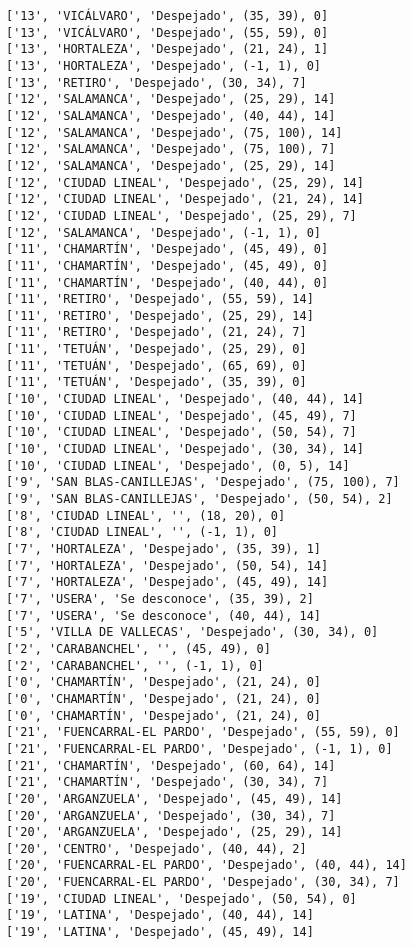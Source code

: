 \documentclass[11pt]{article}
\begin{document}
\begin{Verbatim}[commandchars=\\\{\}]
['13', 'VICÁLVARO', 'Despejado', (35, 39), 0]
['13', 'VICÁLVARO', 'Despejado', (55, 59), 0]
['13', 'HORTALEZA', 'Despejado', (21, 24), 1]
['13', 'HORTALEZA', 'Despejado', (-1, 1), 0]
['13', 'RETIRO', 'Despejado', (30, 34), 7]
['12', 'SALAMANCA', 'Despejado', (25, 29), 14]
['12', 'SALAMANCA', 'Despejado', (40, 44), 14]
['12', 'SALAMANCA', 'Despejado', (75, 100), 14]
['12', 'SALAMANCA', 'Despejado', (75, 100), 7]
['12', 'SALAMANCA', 'Despejado', (25, 29), 14]
['12', 'CIUDAD LINEAL', 'Despejado', (25, 29), 14]
['12', 'CIUDAD LINEAL', 'Despejado', (21, 24), 14]
['12', 'CIUDAD LINEAL', 'Despejado', (25, 29), 7]
['12', 'SALAMANCA', 'Despejado', (-1, 1), 0]
['11', 'CHAMARTÍN', 'Despejado', (45, 49), 0]
['11', 'CHAMARTÍN', 'Despejado', (45, 49), 0]
['11', 'CHAMARTÍN', 'Despejado', (40, 44), 0]
['11', 'RETIRO', 'Despejado', (55, 59), 14]
['11', 'RETIRO', 'Despejado', (25, 29), 14]
['11', 'RETIRO', 'Despejado', (21, 24), 7]
['11', 'TETUÁN', 'Despejado', (25, 29), 0]
['11', 'TETUÁN', 'Despejado', (65, 69), 0]
['11', 'TETUÁN', 'Despejado', (35, 39), 0]
['10', 'CIUDAD LINEAL', 'Despejado', (40, 44), 14]
['10', 'CIUDAD LINEAL', 'Despejado', (45, 49), 7]
['10', 'CIUDAD LINEAL', 'Despejado', (50, 54), 7]
['10', 'CIUDAD LINEAL', 'Despejado', (30, 34), 14]
['10', 'CIUDAD LINEAL', 'Despejado', (0, 5), 14]
['9', 'SAN BLAS-CANILLEJAS', 'Despejado', (75, 100), 7]
['9', 'SAN BLAS-CANILLEJAS', 'Despejado', (50, 54), 2]
['8', 'CIUDAD LINEAL', '', (18, 20), 0]
['8', 'CIUDAD LINEAL', '', (-1, 1), 0]
['7', 'HORTALEZA', 'Despejado', (35, 39), 1]
['7', 'HORTALEZA', 'Despejado', (50, 54), 14]
['7', 'HORTALEZA', 'Despejado', (45, 49), 14]
['7', 'USERA', 'Se desconoce', (35, 39), 2]
['7', 'USERA', 'Se desconoce', (40, 44), 14]
['5', 'VILLA DE VALLECAS', 'Despejado', (30, 34), 0]
['2', 'CARABANCHEL', '', (45, 49), 0]
['2', 'CARABANCHEL', '', (-1, 1), 0]
['0', 'CHAMARTÍN', 'Despejado', (21, 24), 0]
['0', 'CHAMARTÍN', 'Despejado', (21, 24), 0]
['0', 'CHAMARTÍN', 'Despejado', (21, 24), 0]
['21', 'FUENCARRAL-EL PARDO', 'Despejado', (55, 59), 0]
['21', 'FUENCARRAL-EL PARDO', 'Despejado', (-1, 1), 0]
['21', 'CHAMARTÍN', 'Despejado', (60, 64), 14]
['21', 'CHAMARTÍN', 'Despejado', (30, 34), 7]
['20', 'ARGANZUELA', 'Despejado', (45, 49), 14]
['20', 'ARGANZUELA', 'Despejado', (30, 34), 7]
['20', 'ARGANZUELA', 'Despejado', (25, 29), 14]
['20', 'CENTRO', 'Despejado', (40, 44), 2]
['20', 'FUENCARRAL-EL PARDO', 'Despejado', (40, 44), 14]
['20', 'FUENCARRAL-EL PARDO', 'Despejado', (30, 34), 7]
['19', 'CIUDAD LINEAL', 'Despejado', (50, 54), 0]
['19', 'LATINA', 'Despejado', (40, 44), 14]
['19', 'LATINA', 'Despejado', (45, 49), 14]

\end{Verbatim}
\end{document}
